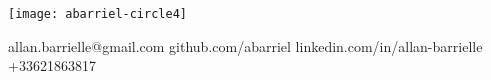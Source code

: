 \begin{minipage}{.22\linewidth}
    \texttt{[image: abarriel-circle4]}
\end{minipage}
\begin{minipage}{.30\linewidth}
\end{minipage}
\begin{minipage}{.6\linewidth}
    \workitems    
    {allan.barrielle@gmail.com}
    {github.com/abarriel}
    {linkedin.com/in/allan-barrielle}
    {+33621863817}
\end{minipage}\hfill
